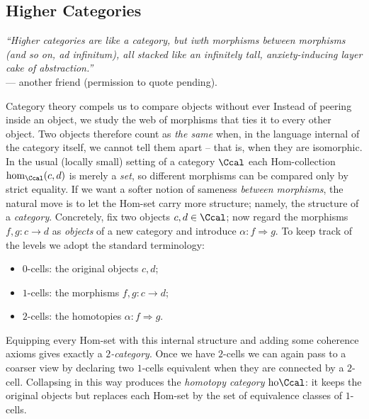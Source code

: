 \documentclass[11pt,a4paper]{article}
\begin{document}
\subsection{Higher Categories}
\begin{flushright}
  \emph{“Higher categories are like a category, but iwth morphisms between morphisms (and so on, ad infinitum), all stacked like an infinitely tall, anxiety-inducing layer cake of abstraction.”}\\
  — another friend (permission to quote pending). 
\end{flushright}
Category theory compels us to compare objects without ever   
Instead of peering inside an object, we study the web of morphisms that ties it to every other object. Two objects therefore count as \emph{the same} when, in the language internal of the category itself, we cannot tell them apart -- that is, when they are isomorphic. \\

In the usual (locally small) setting of a category $\Ccal$ each Hom-collection $\hom_{\Ccal}(c,d)$ is merely a \emph{set}, so different morphisms can be compared only by strict equality.  If we want a softer notion of sameness \emph{between morphisms}, the natural move is to let the Hom-set carry more
structure; namely, the structure of a \emph{category}.  Concretely, fix two objects $c,d \in \Ccal$; now regard the morphisms $f,g \colon c \to d$ as
\emph{objects} of a new category and introduce  $\alpha \colon f \Rightarrow g$. To keep track of the levels we adopt the standard terminology:

\begin{itemize}
  \item $0$-cells: the original objects $c,d$;
  \item $1$-cells: the morphisms $f,g\colon c \to d$;
  \item $2$-cells: the homotopies $\alpha \colon f \Rightarrow g$.
\end{itemize}

Equipping every Hom-set with this internal structure and adding some coherence axioms gives exactly a \emph{$2$-category}.  Once we have $2$-cells we can again pass to a coarser view by declaring two $1$-cells equivalent when they are connected by a $2$-cell.  Collapsing in this way
produces the \emph{homotopy category} $\mathrm{ho}\Ccal$: it keeps the original objects but replaces each Hom-set by the set of equivalence classes of $1$-cells. \\
\end{document}
